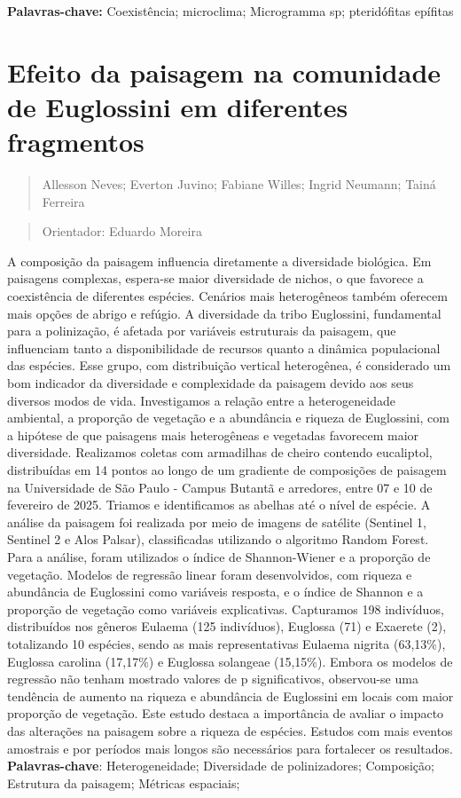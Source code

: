 \documentclass[
]{book}
\begin{document}
\textbf{Palavras-chave:} Coexistência; microclima; Microgramma sp; pteridófitas epífitas

\chapter{Efeito da paisagem na comunidade de Euglossini em diferentes fragmentos}\label{efeito-da-paisagem-na-comunidade-de-euglossini-em-diferentes-fragmentos}

\begin{quote}
Allesson Neves; Everton Juvino; Fabiane Willes; Ingrid Neumann; Tainá Ferreira
\end{quote}

\begin{quote}
Orientador: Eduardo Moreira
\end{quote}

A composição da paisagem influencia diretamente a diversidade biológica. Em paisagens complexas, espera-se maior diversidade de nichos, o que favorece a coexistência de diferentes espécies. Cenários mais heterogêneos também oferecem mais opções de abrigo e refúgio. A diversidade da tribo Euglossini, fundamental para a polinização, é afetada por variáveis estruturais da paisagem, que influenciam tanto a disponibilidade de recursos quanto a dinâmica populacional das espécies. Esse grupo, com distribuição vertical heterogênea, é considerado um bom indicador da diversidade e complexidade da paisagem devido aos seus diversos modos de vida. Investigamos a relação entre a heterogeneidade ambiental, a proporção de vegetação e a abundância e riqueza de Euglossini, com a hipótese de que paisagens mais heterogêneas e vegetadas favorecem maior diversidade. Realizamos coletas com armadilhas de cheiro contendo eucaliptol, distribuídas em 14 pontos ao longo de um gradiente de composições de paisagem na Universidade de São Paulo - Campus Butantã e arredores, entre 07 e 10 de fevereiro de 2025. Triamos e identificamos as abelhas até o nível de espécie. A análise da paisagem foi realizada por meio de imagens de satélite (Sentinel 1, Sentinel 2 e Alos Palsar), classificadas utilizando o algoritmo Random Forest. Para a análise, foram utilizados o índice de Shannon-Wiener e a proporção de vegetação. Modelos de regressão linear foram desenvolvidos, com riqueza e abundância de Euglossini como variáveis resposta, e o índice de Shannon e a proporção de vegetação como variáveis explicativas. Capturamos 198 indivíduos, distribuídos nos gêneros Eulaema (125 indivíduos), Euglossa (71) e Exaerete (2), totalizando 10 espécies, sendo as mais representativas Eulaema nigrita (63,13\%), Euglossa carolina (17,17\%) e Euglossa solangeae (15,15\%). Embora os modelos de regressão não tenham mostrado valores de p significativos, observou-se uma tendência de aumento na riqueza e abundância de Euglossini em locais com maior proporção de vegetação. Este estudo destaca a importância de avaliar o impacto das alterações na paisagem sobre a riqueza de espécies. Estudos com mais eventos amostrais e por períodos mais longos são necessários para fortalecer os resultados.
\textbf{Palavras-chave}: Heterogeneidade; Diversidade de polinizadores; Composição; Estrutura da paisagem; Métricas espaciais;
\end{document}
